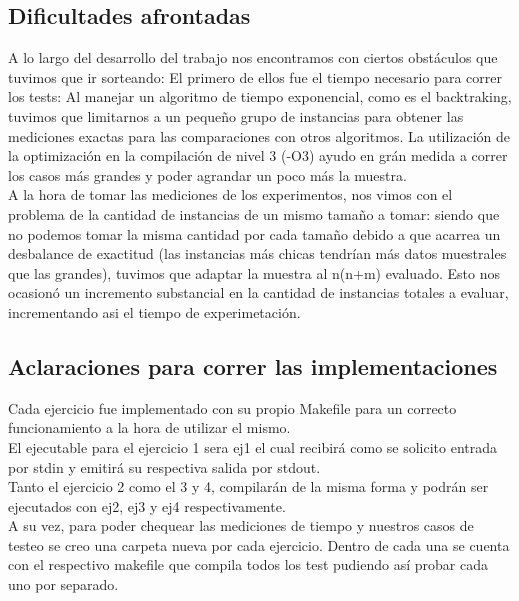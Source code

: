 \subsection{Dificultades afrontadas}

A lo largo del desarrollo del trabajo nos encontramos con ciertos obstáculos que tuvimos que ir sorteando:
El primero de ellos fue el tiempo necesario para correr los tests: Al manejar un algoritmo de tiempo exponencial, como es el backtraking, tuvimos que limitarnos a un pequeño grupo de instancias para obtener las mediciones exactas para las comparaciones con otros algoritmos. La utilización de la optimización en la compilación de nivel 3 (-O3) ayudo en grán medida a correr los casos más grandes y poder agrandar un poco más la muestra.\\
A la hora de tomar las mediciones de los experimentos, nos vimos con el problema de la cantidad de instancias de un mismo tamaño a tomar: siendo que no podemos tomar la misma cantidad por cada tamaño debido a que acarrea un desbalance de exactitud (las instancias más chicas tendrían más datos muestrales que las grandes), tuvimos que adaptar la muestra al n(n+m) evaluado. Esto nos ocasionó un incremento substancial en la cantidad de instancias totales a evaluar, incrementando asi el tiempo de experimetación.\\

\subsection{Aclaraciones para correr las implementaciones}

Cada ejercicio fue implementado con su propio Makefile para un correcto funcionamiento a la hora de utilizar el mismo.\\
El ejecutable para el ejercicio 1 sera ej1 el cual recibir\'a como se solicito entrada por stdin y emitir\'a su respectiva salida por stdout.\\
Tanto el ejercicio 2 como el 3 y 4, compilar\'an de la misma forma y podr\'an ser ejecutados con ej2, ej3 y ej4 respectivamente.\\
A su vez, para poder chequear las mediciones de tiempo y nuestros casos de testeo se creo una carpeta nueva por cada ejercicio. Dentro de cada una se cuenta con el respectivo makefile que compila todos los test pudiendo as\'i probar cada uno por separado.